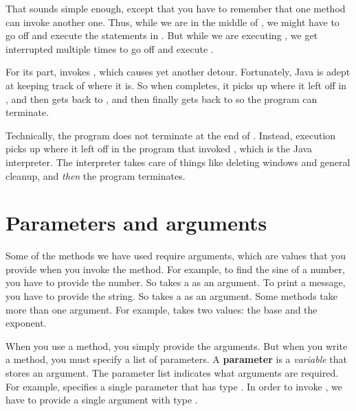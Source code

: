 That sounds simple enough, except that you have to remember that one method can invoke another one.
Thus, while we are in the middle of , we might have to go off and execute the statements in .
But while we are executing , we get interrupted multiple times to go off and execute .

For its part,  invokes , which causes yet another detour.
Fortunately, Java is adept at keeping track of where it is.
So when  completes, it picks up where it left off in , and then gets back to , and then finally gets back to  so the program can terminate.

Technically, the program does not terminate at the end of .
Instead, execution picks up where it left off in the program that invoked , which is the Java interpreter.
The interpreter takes care of things like deleting windows and general cleanup, and {\em then} the program terminates.



\section{Parameters and arguments}


Some of the methods we have used require arguments, which are values that you provide when you invoke the method.
For example, to find the sine of a number, you have to provide the number.
So  takes a  as an argument.
To print a message, you have to provide the string.
So  takes a  as an argument.
Some methods take more than one argument.
For example,  takes two  values: the base and the exponent.

When you use a method, you simply provide the arguments.
But when you write a method, you must specify a list of parameters.
A {\bf parameter} is a {\em variable} that stores an argument.
The parameter list indicates what arguments are required.
For example,  specifies a single parameter  that has type .
In order to invoke , we have to provide a single argument with type .

